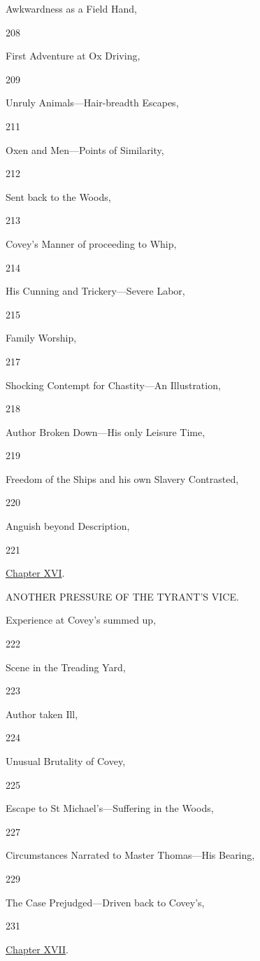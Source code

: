 Awkwardness as a Field Hand,

208

First Adventure at Ox Driving,

209

Unruly Animals---Hair-breadth Escapes,

211

Oxen and Men---Points of Similarity,

212

Sent back to the Woods,

213

Covey's Manner of proceeding to Whip,

214

His Cunning and Trickery---Severe Labor,

215

Family Worship,

217

Shocking Contempt for Chastity---An Illustration,

218

Author Broken Down---His only Leisure Time,

219

Freedom of the Ships and his own Slavery Contrasted,

220

Anguish beyond Description,

221

\href{/wiki/My_Bondage_and_My_Freedom_(1855)/Chapter_XVI}{Chapter XVI}.

ANOTHER PRESSURE OF THE TYRANT'S VICE.

Experience at Covey's summed up,

222

Scene in the Treading Yard,

223

Author taken Ill,

224

Unusual Brutality of Covey,

225

Escape to St Michael's---Suffering in the Woods,

227

Circumstances Narrated to Master Thomas---His Bearing,

229

The Case Prejudged---Driven back to Covey's,

231

\href{/wiki/My_Bondage_and_My_Freedom_(1855)/Chapter_XVII}{Chapter
XVII}.

